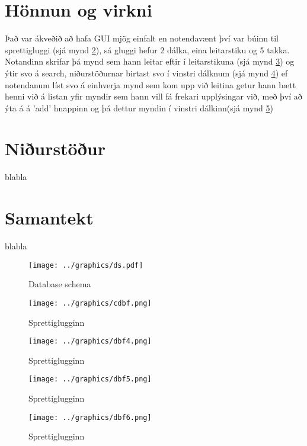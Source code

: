 \documentclass[12pt, git, final]{rureport}
\begin{document}
\section{Hönnun og virkni}
Það var ákveðið að hafa GUI mjög einfalt en notendavænt því var búinn til sprettigluggi (sjá mynd \ref{fig:cdbf}), sá gluggi hefur 2 dálka, eina leitarstiku og 5 takka. 
Notandinn skrifar þá mynd sem hann leitar eftir í leitarstikuna (sjá mynd \ref{fig:dbf4}) og ýtir svo á search, niðurstöðurnar birtast svo í vinstri dálknum (sjá mynd \ref{fig:dbf5}) ef notendanum líst svo á einhverja mynd sem kom upp við leitina  getur hann bætt henni við á listan yfir myndir sem hann vill fá frekari upplýsingar við, með því að ýta á á 'add' hnappinn og þá dettur myndin í vinstri dálkinn(sjá mynd \ref{fig:dbf6})

\section{Niðurstöður}\label{nidurstodur}
blabla


\section{Samantekt}
%
blabla

\pagebreak
\begin{figure}
	\centering 
	\texttt{[image: ../graphics/ds.pdf]}
	\caption{Database schema \label{fig:dataschema}}
\end{figure}

\begin{figure}
	\centering 
	\texttt{[image: ../graphics/cdbf.png]}
	\caption{Sprettiglugginn \label{fig:cdbf}}
\end{figure}

\begin{figure}
	\centering 
	\texttt{[image: ../graphics/dbf4.png]}
	\caption{Sprettiglugginn \label{fig:dbf4}}
\end{figure}

\begin{figure}
	\centering 
	\texttt{[image: ../graphics/dbf5.png]}
	\caption{Sprettiglugginn \label{fig:dbf5}}
\end{figure}

\begin{figure}
	\centering 
	\texttt{[image: ../graphics/dbf6.png]}
	\caption{Sprettiglugginn \label{fig:dbf6}}
\end{figure}


%
\clearpage
\printbibliography
\end{document}
